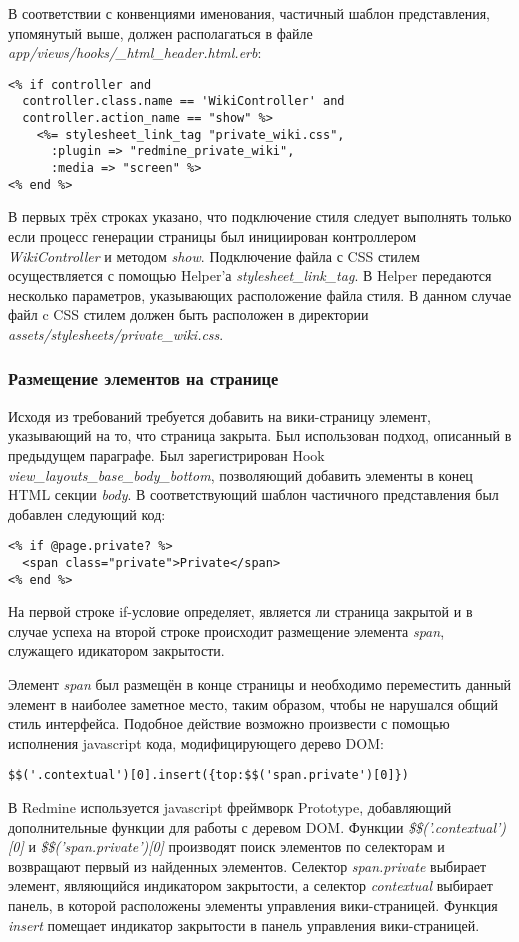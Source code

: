 В соответствии с конвенциями именования, частичный шаблон представления,
упомянутый выше, должен располагаться в файле
\textit{app/views/hooks/\_html\_header.html.erb}:
\small{\begin{lstlisting}
<% if controller and
  controller.class.name == 'WikiController' and
  controller.action_name == "show" %>
    <%= stylesheet_link_tag "private_wiki.css",
      :plugin => "redmine_private_wiki",
      :media => "screen" %>
<% end %>
\end{lstlisting}}
В первых трёх строках указано, что подключение стиля следует выполнять только
если процесс генерации страницы был инициирован контроллером
\textit{WikiController} и методом \textit{show}. Подключение файла с CSS стилем
осуществляется с помощью Helper'а \textit{stylesheet\_link\_tag}.  В Helper
передаются несколько параметров, указывающих расположение файла стиля. В данном
случае файл c CSS стилем должен быть расположен в директории
\textit{assets/stylesheets/private\_wiki.css}.

\subsubsection{Размещение элементов на странице}
Исходя из требований требуется добавить на вики-страницу элемент, указывающий
на то, что страница закрыта. Был использован подход, описанный в предыдущем
параграфе. Был зарегистрирован Hook \textit{view\_layouts\_base\_body\_bottom},
позволяющий добавить элементы в конец HTML секции \textit{body}. В
соответствующий шаблон частичного представления был добавлен следующий код:
\small{\begin{lstlisting}
<% if @page.private? %>
  <span class="private">Private</span>
<% end %>
\end{lstlisting}}
На первой строке if-условие определяет, является ли страница закрытой и в
случае успеха на второй строке происходит размещение элемента \textit{span},
служащего идикатором закрытости.

Элемент \textit{span} был размещён в конце страницы и необходимо переместить
данный элемент в наиболее заметное место, таким образом, чтобы не нарушался
общий стиль интерфейса. Подобное действие возможно произвести с помощью
исполнения javascript кода, модифицирующего дерево DOM:
\small{\begin{lstlisting}
$$('.contextual')[0].insert({top:$$('span.private')[0]})
\end{lstlisting}}
В Redmine используется javascript фреймворк Prototype, добавляющий
дополнительные функции для работы с деревом DOM. Функции
\textit{\$\$('.contextual')[0]} и \textit{\$\$('span.private')[0]} производят
поиск элементов по селекторам и возвращают первый из найденных элементов.
Селектор \textit{span.private} выбирает элемент, являющийся индикатором
закрытости, а селектор \textit{contextual} выбирает панель, в которой
расположены элементы управления вики-страницей. Функция \textit{insert}
помещает индикатор закрытости в панель управления вики-страницей.

